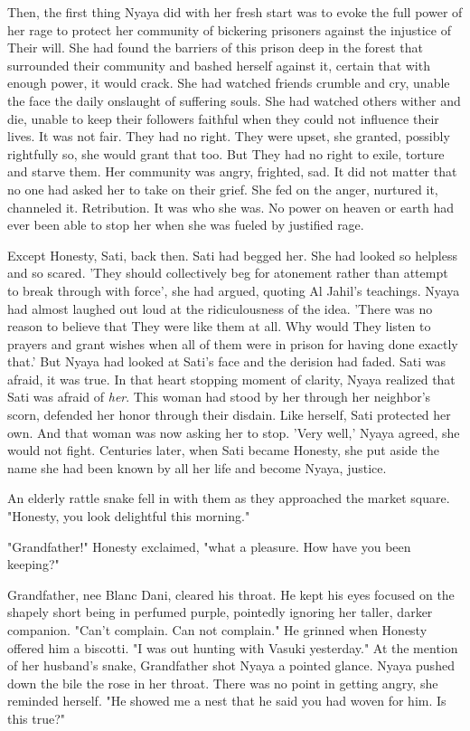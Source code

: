 \documentclass{amsart}
\begin{document}
Then, the first thing Nyaya did with her fresh start was to evoke the full power of her rage to protect her community of bickering prisoners against the injustice of Their will. She had found the barriers of this prison deep in the forest that surrounded their community and bashed herself against it, certain that with enough power, it would crack. She had watched friends crumble and cry, unable the face the daily onslaught of suffering souls. She had watched others wither and die, unable to keep their followers faithful when they could not influence their lives. It was not fair. They had no right. They were upset, she granted, possibly rightfully so, she would grant that too. But They had no right to exile, torture and starve them. Her community was angry, frighted, sad. It did not matter that no one had asked her to take on their grief. She fed on the anger, nurtured it, channeled it. Retribution. It was who she was. No power on heaven or earth had ever been able to stop her when she was fueled by justified rage. 

Except Honesty, Sati, back then. Sati had begged her. She had looked so helpless and so scared. 'They should collectively beg for atonement rather than attempt to break through with force', she had argued, quoting Al Jahil's teachings. Nyaya had almost laughed out loud at the ridiculousness of the idea. 'There was no reason to believe that They were like them at all. Why would They listen to prayers and grant wishes when all of them were in prison for having done exactly that.' But Nyaya had looked at Sati's face and the derision had faded. Sati was afraid, it was true. In that heart stopping moment of clarity, Nyaya realized that Sati was afraid of \emph{her}. This woman had stood by her through her neighbor's scorn, defended her honor through their disdain. Like herself, Sati protected her own. And that woman was now asking her to stop. 'Very well,' Nyaya agreed, she would not fight. Centuries later, when Sati became Honesty, she put aside the name she had been known by all her life and become Nyaya, justice. 

An elderly rattle snake fell in with them as they approached the market square. "Honesty, you look delightful this morning."

"Grandfather!" Honesty exclaimed, "what a pleasure. How have you been keeping?" 

Grandfather, nee Blanc Dani, cleared his throat. He kept his eyes focused on the shapely short being in perfumed purple, pointedly ignoring her taller, darker companion. "Can't complain. Can not complain."  He grinned when Honesty offered him a biscotti. "I was out hunting with Vasuki yesterday." At the mention of her husband's snake, Grandfather shot Nyaya a pointed glance. Nyaya pushed down the bile the rose in her throat. There was no point in getting angry, she reminded herself. "He showed me a nest that he said you had woven for him. Is this true?"
\end{document}
